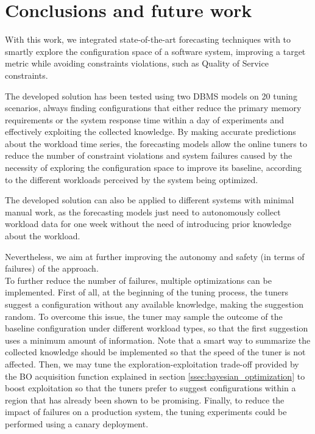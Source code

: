 \documentclass[a4paper, 12pt]{article} %
\begin{document}
	\clearpage
	\section{Conclusions and future work}
	With this work, we integrated state-of-the-art forecasting techniques with \cite{AkamasCGP} to smartly explore the configuration space of a software system, improving a target metric while avoiding constraints violations, such as Quality of Service constraints. 
	
	The developed solution has been tested using two DBMS models on 20 tuning scenarios, always finding configurations that either reduce the primary memory requirements or the system response time within a day of experiments and effectively exploiting the collected knowledge. By making accurate predictions about the workload time series, the forecasting models allow the online tuners to reduce the number of constraint violations and system failures caused by the necessity of exploring the configuration space to improve its baseline, according to the different workloads perceived by the system being optimized. 
	
	The developed solution can also be applied to different systems with minimal manual work, as the forecasting models just need to autonomously collect workload data for one week without the need of introducing prior knowledge about the workload.
	
	Nevertheless, we aim at further improving the autonomy and safety (in terms of failures) of the approach. \\	
	To further reduce the number of failures, multiple optimizations can be implemented. First of all, at the beginning of the tuning process, the tuners suggest a configuration without any available knowledge, making the suggestion random. To overcome this issue, the tuner may sample the outcome of the baseline configuration under different workload types, so that the first suggestion uses a minimum amount of information. Note that a smart way to summarize the collected knowledge should be implemented so that the speed of the tuner is not affected. Then, we may tune the exploration-exploitation trade-off provided by the BO acquisition function explained in section \ref{ssec:bayesian_optimization} to boost exploitation so that the tuners prefer to suggest configurations within a region that has already been shown to be promising. Finally, to reduce the impact of failures on a production system, the tuning experiments could be performed using a canary deployment.
	
\end{document}
